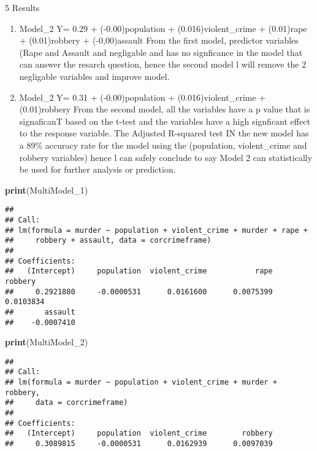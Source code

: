 \documentclass[]{article}
\newenvironment{Shaded}{\begin{snugshade}}{\end{snugshade}}
\newcommand{\KeywordTok}[1]{\textcolor[rgb]{0.13,0.29,0.53}{\textbf{#1}}}
\newcommand{\DecValTok}[1]{\textcolor[rgb]{0.00,0.00,0.81}{#1}}
\newcommand{\NormalTok}[1]{#1}
\begin{document}
5 Results

\begin{enumerate}
\def\labelenumi{\alph{enumi})}
\item
  Model\_2 Y= 0.29 + (-0.00)population + (0.016)violent\_crime +
  (0.01)rape + (0.01)robbery + (-0,00)assault From the first model,
  predictor variables (Rape and Assault and negligable and has no
  signficance in the model that can answer the resarch question, hence
  the second model l will remove the 2 negligable variables and improve
  model.
\item
  Model\_2 Y= 0.31 + (-0.00)population + (0.016)violent\_crime
  +(0.01)robbery From the second model, all the variables have a p value
  that is signaficanT based on the t-test and the variables have a high
  signficant effect to the response variable. The Adjusted R-squared
  test IN the new model has a 89\% accuracy rate for the model using the
  (population, violent\_crime and robbery variables) hence l can safely
  conclude to say Model 2 can statistically be used for further analysis
  or prediction.
\end{enumerate}

\begin{Shaded}
\begin{Highlighting}[]
\KeywordTok{print}\NormalTok{(MultiModel_}\DecValTok{1}\NormalTok{)}
\end{Highlighting}
\end{Shaded}

\begin{verbatim}
## 
## Call:
## lm(formula = murder ~ population + violent_crime + murder + rape + 
##     robbery + assault, data = corcrimeframe)
## 
## Coefficients:
##   (Intercept)     population  violent_crime           rape        robbery  
##     0.2921880     -0.0000531      0.0161600      0.0075399      0.0103834  
##       assault  
##    -0.0007410
\end{verbatim}

\begin{Shaded}
\begin{Highlighting}[]
\KeywordTok{print}\NormalTok{(MultiModel_}\DecValTok{2}\NormalTok{)}
\end{Highlighting}
\end{Shaded}

\begin{verbatim}
## 
## Call:
## lm(formula = murder ~ population + violent_crime + murder + robbery, 
##     data = corcrimeframe)
## 
## Coefficients:
##   (Intercept)     population  violent_crime        robbery  
##     0.3089815     -0.0000531      0.0162939      0.0097039
\end{verbatim}
\end{document}
